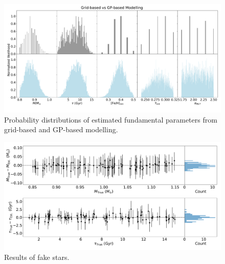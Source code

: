 \begin{figure}
	\includegraphics[width=2.0\columnwidth]{gp_fitting.pdf}
    \caption{Probability distributions of estimated fundamental parameters from grid-based and GP-based modelling. } 
  \label{fig:fit_comparison}
\end{figure}


\begin{figure}
	\includegraphics[width=2.0\columnwidth]{fake-stars-test.pdf}
    \caption{Results of fake stars.} 
  \label{fig:fake_test}
\end{figure}









